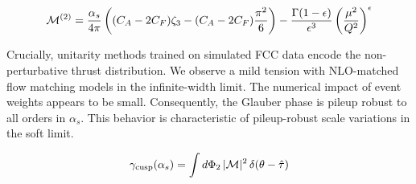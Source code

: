 \begin{equation}
  \mathcal{M}^{(2)} = \frac{\alpha_s}{4\pi} \left( (C_A - 2C_F) \zeta_{3} - (C_A - 2C_F) \frac{\pi^2}{6} \right) - \frac{\Gamma(1-\epsilon)}{\epsilon^{3}} \left(\frac{\mu^2}{Q^2}\right)^{\epsilon}
  \label{eq:4}
\end{equation}

Crucially, unitarity methods trained on simulated FCC data encode the
non-perturbative thrust distribution. We observe a mild tension with
NLO-matched flow matching models in the infinite-width limit. The
numerical impact of event weights appears to be small. Consequently, the
Glauber phase is pileup robust to all orders in $\alpha_s$. This
behavior is characteristic of pileup-robust scale variations in the soft
limit.

\begin{equation}
  \gamma_{\rm cusp}(\alpha_s) = \int d\Phi_{2} \, |\mathcal{M}|^2 \, \delta(\theta - \hat{\tau})
  \label{eq:5}
\end{equation}

